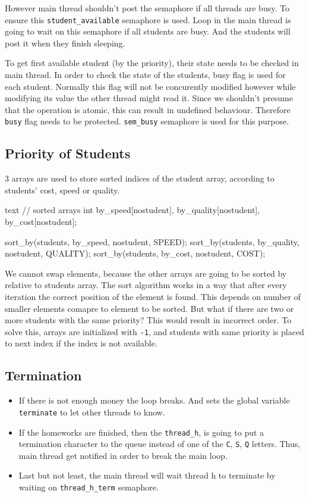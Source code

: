 \documentclass[a4paper]{article}
\begin{document}
However main thread shouldn't post the semaphore if all threads are busy. To ensure this \texttt{student\_available} semaphore is used. Loop in the main thread is going to wait on this semaphore if all students are busy. And the students will post it when they finish sleeping.

To get first available student (by the priority), their state needs to be checked in main thread. In order to check the state of the students, busy flag is used for each student. Normally this flag will not be concurently modified however while modifying its value the other thread might read it. Since we shouldn't presume that the operation is atomic, this can result in undefined behaviour. Therefore \texttt{busy} flag needs to be protected. \texttt{sem\_busy} semaphore is used for this purpose.

\newpage

\subsection*{Priority of Students}
\label{sec:org2274fbf}
3 arrays are used to store sorted indices of the student array, according to students' cost, speed or quality.

\begin{ccode}[fontsize=\small,frame=single,framesep=3mm]{text}
// sorted arrays
int by_speed[nostudent], by_quality[nostudent], by_cost[nostudent];

sort_by(students, by_speed, nostudent, SPEED);
sort_by(students, by_quality, nostudent, QUALITY);
sort_by(students, by_cost, nostudent, COST);
\end{ccode}

We cannot swap elements, because the other arrays are going to be sorted by relative to students array. The sort algorithm works in a way that after every iteration the correct position of the element is found. This depends on number of smaller elements comapre to element to be sorted. But what if there are two or more students with the same priority? This would result in incorrect order. To solve this, arrays are initialized with \texttt{-1}, and students with same priority is placed to next index if the index is not available.


\subsection*{Termination}
\label{sec:org654fcd8}

\begin{itemize}
\item If there is not enough money the loop breaks. And sets the global variable \texttt{terminate} to let other threads to know.
\item If the homeworks are finished, then the \texttt{thread\_h}, is going to put a termination character to the queue instead of one of the \texttt{C}, \texttt{S}, \texttt{Q} letters. Thus, main thread get notified in order to break the main loop.
\item Last but not least, the main thread will wait thread h to terminate by waiting on \texttt{thread\_h\_term} semaphore.
\end{itemize}
\end{document}
